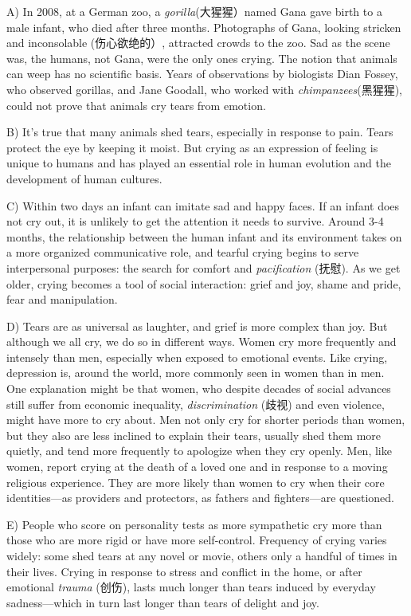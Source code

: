 \documentclass[UTF8,11pt]{ctexart}
\begin{document}
A) In 2008, at a German zoo, a\textit{ gorilla}(大猩猩）named Gana gave birth to a male infant, who died after three months. Photographs of Gana, looking stricken and inconsolable (伤心欲绝的）, attracted crowds to the zoo. Sad as the scene was, the humans, not Gana, were the only ones crying. The notion that animals can weep has no scientific basis. Years of observations by biologists Dian Fossey, who observed gorillas, and Jane Goodall, who worked with\textit{ chimpanzees}(黑猩猩), could not prove that animals cry tears from emotion.


B) It’s true that many animals shed tears, especially in response to pain. Tears protect the eye by keeping it moist. But crying as an expression of feeling is unique to humans and has played an essential role in human evolution and the development of human cultures.


C) Within two days an infant can imitate sad and happy faces. If an infant does not cry out, it is unlikely to get the attention it needs to survive. Around 3-4 months, the relationship between the human infant and its environment takes on a more organized communicative role, and tearful crying begins to serve interpersonal purposes: the search for comfort and \textit{pacification} (抚慰). As we get older, crying becomes a tool of social interaction: grief and joy, shame and pride, fear and manipulation.


D) Tears are as universal as laughter, and grief is more complex than joy. But although we all cry, we do so in different ways. Women cry more frequently and intensely than men, especially when exposed to emotional events. Like crying, depression is, around the world, more commonly seen in women than in men. One explanation might be that women, who despite decades of social advances still suffer from economic inequality,\textit{ discrimination} (歧视) and even violence, might have more to cry about. Men not only cry for shorter periods than women, but they also are less inclined to explain their tears, usually shed them more quietly, and tend more frequently to apologize when they cry openly. Men, like women, report crying at the death of a loved one and in response to a moving religious experience. They are more likely than women to cry when their core identities—as providers and protectors, as fathers and fighters—are questioned.


E) People who score on personality tests as more sympathetic cry more than those who are more rigid or have more self-control. Frequency of crying varies widely: some shed tears at any novel or movie, others only a handful of times in their lives. Crying in response to stress and conflict in the home, or after emotional\textit{ trauma} (创伤), lasts much longer than tears induced by everyday sadness—which in turn last longer than tears of delight and joy.
\end{document}
